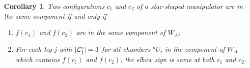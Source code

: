 \documentclass[twocolumn]{IEEEtran}
\newtheorem{Corollary}{{\bf Corollary}}
\newtheorem{Remark}{{\bf Remark}}
\begin{document}
\smallskip

\begin{Corollary}
\label{cor-1} \rm Two configurations $c_1$ and $c_2$ of a
star-shaped manipulator are in the same component if and only if
\begin{enumerate}
\item $f(c_1)$ and $f(c_2)$ are in the same component of $W_A$;
\item For each leg $j$ with $|{\cal L}_j^*|=3$ for all chambers
${}^d\!U_i$ in the component of $W_A$ which contains $f(c_1)$ and
$f(c_2)$, the elbow sign is same at both $c_1$ and $c_2$.
\end{enumerate}
\end{Corollary}



%
%
%

%
\end{document}
